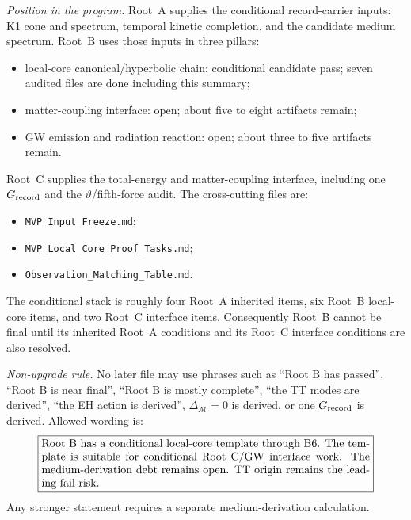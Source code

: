 \documentclass[11pt]{article}
\begin{document}
\medskip\noindent\textit{Position in the program.}
Root~A supplies the conditional record-carrier inputs: K1 cone and spectrum,
temporal kinetic completion, and the candidate medium spectrum.  Root~B uses
those inputs in three pillars:
\begin{itemize}
\item local-core canonical/hyperbolic chain: conditional candidate pass;
  seven audited files are done including this summary;
\item matter-coupling interface: open; about five to eight artifacts remain;
\item GW emission and radiation reaction: open; about three to five artifacts
  remain.
\end{itemize}
Root~C supplies the total-energy and matter-coupling interface, including one
\(G_{\rm record}\) and the \(\vartheta\)/fifth-force audit.  The cross-cutting
files are:
\begin{itemize}
\item \texttt{MVP\_Input\_Freeze.md};
\item \texttt{MVP\_Local\_Core\_Proof\_Tasks.md};
\item \texttt{Observation\_Matching\_Table.md}.
\end{itemize}
The conditional stack is roughly four Root~A inherited items, six Root~B
local-core items, and two Root~C interface items.  Consequently Root~B cannot
be final until its inherited Root~A conditions and its Root~C interface
conditions are also resolved.

\medskip\noindent\textit{Non-upgrade rule.}
No later file may use phrases such as ``Root B has passed'', ``Root B is near
final'', ``Root B is mostly complete'', ``the TT modes are derived'', ``the EH
action is derived'', \(\Delta_{\mathcal M}=0\) is derived, or one
\(G_{\rm record}\) is derived.  Allowed wording is:
\[
\boxed{
\begin{minipage}{0.86\linewidth}
Root~B has a conditional local-core template through B6.  The template is
suitable for conditional Root~C/GW interface work.  The medium-derivation debt
remains open.  TT origin remains the leading fail-risk.
\end{minipage}}
\]
Any stronger statement requires a separate medium-derivation calculation.
\end{document}
